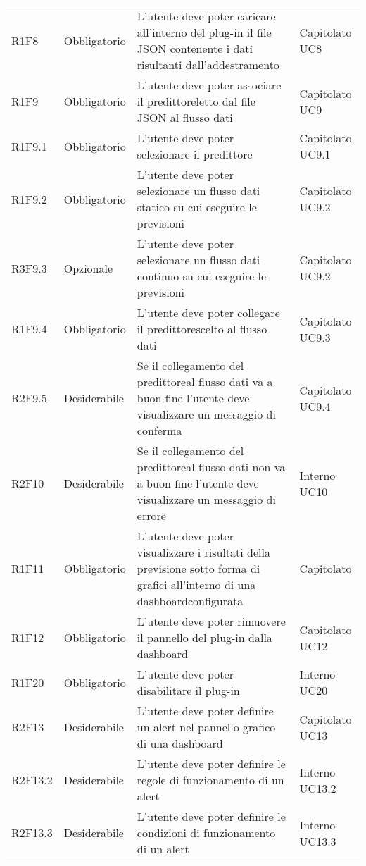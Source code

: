 \begin{longtable} {
		>{}p{24mm} 
		>{}p{32mm}
		>{}p{40mm} 
		>{}p{24.5mm}
		}
		R1F8 & Obbligatorio & L'utente deve poter caricare all'interno del plug-in il file JSON contenente i dati risultanti dall'addestramento & Capitolato UC8 \TBstrut \\ [2mm]
		R1F9 & Obbligatorio & L'utente deve poter associare il predittore\glosp letto dal file JSON al flusso dati & Capitolato UC9 \TBstrut \\ [2mm]
		R1F9.1 & Obbligatorio & L'utente deve poter selezionare il predittore\glo & Capitolato UC9.1 \TBstrut \\ [2mm]
		R1F9.2 & Obbligatorio & L'utente deve poter selezionare un flusso dati statico su cui eseguire le previsioni & Capitolato UC9.2 \TBstrut \\ [2mm]
		R3F9.3 & Opzionale & L'utente deve poter selezionare un flusso dati continuo su cui eseguire le previsioni & Capitolato UC9.2 \TBstrut \\ [2mm]
		R1F9.4 & Obbligatorio & L'utente deve poter collegare il predittore\glosp scelto al flusso dati & Capitolato UC9.3 \TBstrut \\ [2mm]
		R2F9.5 & Desiderabile & Se il collegamento del predittore\glosp al flusso dati va a buon fine l'utente deve visualizzare un messaggio di conferma & Capitolato UC9.4 \TBstrut \\ [2mm]
		R2F10 & Desiderabile & Se il collegamento del predittore\glosp al flusso dati non va a buon fine l'utente deve visualizzare un messaggio di errore & Interno UC10 \TBstrut \\ [2mm]
		R1F11 & Obbligatorio & L'utente deve poter visualizzare i risultati della previsione sotto forma di grafici all'interno di una dashboard\glosp configurata & Capitolato \TBstrut \\ [2mm]
		R1F12 & Obbligatorio & L'utente deve poter rimuovere il pannello del plug-in dalla dashboard\glo & Capitolato UC12 \TBstrut \\ [2mm]	
		R1F20 & Obbligatorio & L'utente deve poter disabilitare il plug-in & Interno UC20 \TBstrut \\ [2mm]	
		R2F13 &	Desiderabile & L'utente deve poter definire un alert nel pannello grafico di una dashboard\glo & Capitolato UC13 \TBstrut \\ [2mm]					
		R2F13.2 & Desiderabile & L'utente deve poter definire le regole di funzionamento di un alert\glo & Interno UC13.2 \TBstrut \\ [2mm]		
		R2F13.3 & Desiderabile & L'utente deve poter definire le condizioni di funzionamento di un alert\glo & Interno UC13.3 \TBstrut \\ [2mm]

\end{longtable}
